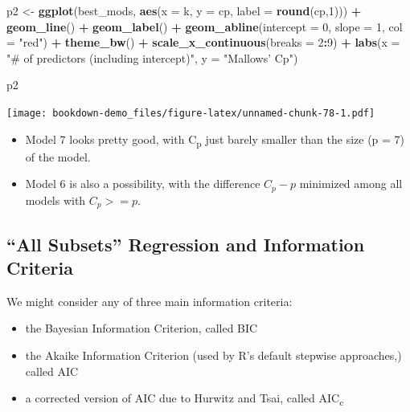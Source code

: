 \documentclass[]{book}
\newenvironment{Shaded}{\begin{snugshade}}{\end{snugshade}}
\newcommand{\KeywordTok}[1]{\textcolor[rgb]{0.13,0.29,0.53}{\textbf{#1}}}
\newcommand{\DataTypeTok}[1]{\textcolor[rgb]{0.13,0.29,0.53}{#1}}
\newcommand{\DecValTok}[1]{\textcolor[rgb]{0.00,0.00,0.81}{#1}}
\newcommand{\StringTok}[1]{\textcolor[rgb]{0.31,0.60,0.02}{#1}}
\newcommand{\OperatorTok}[1]{\textcolor[rgb]{0.81,0.36,0.00}{\textbf{#1}}}
\newcommand{\NormalTok}[1]{#1}
\providecommand{\tightlist}{%
  \setlength{\itemsep}{0pt}\setlength{\parskip}{0pt}}
\theoremstyle{definition}
\theoremstyle{definition}
\theoremstyle{definition}
\theoremstyle{remark}
\begin{document}
\begin{Shaded}
\begin{Highlighting}[]
\NormalTok{p2 <-}\StringTok{ }\KeywordTok{ggplot}\NormalTok{(best_mods, }\KeywordTok{aes}\NormalTok{(}\DataTypeTok{x =}\NormalTok{ k, }\DataTypeTok{y =}\NormalTok{ cp,}
                            \DataTypeTok{label =} \KeywordTok{round}\NormalTok{(cp,}\DecValTok{1}\NormalTok{))) }\OperatorTok{+}
\StringTok{    }\KeywordTok{geom_line}\NormalTok{() }\OperatorTok{+}
\StringTok{    }\KeywordTok{geom_label}\NormalTok{() }\OperatorTok{+}
\StringTok{    }\KeywordTok{geom_abline}\NormalTok{(}\DataTypeTok{intercept =} \DecValTok{0}\NormalTok{, }\DataTypeTok{slope =} \DecValTok{1}\NormalTok{,}
                \DataTypeTok{col =} \StringTok{"red"}\NormalTok{) }\OperatorTok{+}
\StringTok{    }\KeywordTok{theme_bw}\NormalTok{() }\OperatorTok{+}
\StringTok{    }\KeywordTok{scale_x_continuous}\NormalTok{(}\DataTypeTok{breaks =} \DecValTok{2}\OperatorTok{:}\DecValTok{9}\NormalTok{) }\OperatorTok{+}
\StringTok{    }\KeywordTok{labs}\NormalTok{(}\DataTypeTok{x =} \StringTok{"# of predictors (including intercept)"}\NormalTok{,}
         \DataTypeTok{y =} \StringTok{"Mallows' Cp"}\NormalTok{)}

\NormalTok{p2}
\end{Highlighting}
\end{Shaded}

\texttt{[image: bookdown-demo\_files/figure-latex/unnamed-chunk-78-1.pdf]}

\begin{itemize}
\tightlist
\item
  Model 7 looks pretty good, with C\textsubscript{p} just barely smaller
  than the size (p = 7) of the model.
\item
  Model 6 is also a possibility, with the difference \(C_p - p\)
  minimized among all models with \(C_p >= p\).
\end{itemize}

\subsection{\texorpdfstring{``All Subsets'' Regression and Information
Criteria}{All Subsets Regression and Information Criteria}}\label{all-subsets-regression-and-information-criteria}

We might consider any of three main information criteria:

\begin{itemize}
\tightlist
\item
  the Bayesian Information Criterion, called BIC
\item
  the Akaike Information Criterion (used by R's default stepwise
  approaches,) called AIC
\item
  a corrected version of AIC due to Hurwitz and Tsai, called
  AIC\textsubscript{c}
\end{itemize}
\end{document}
